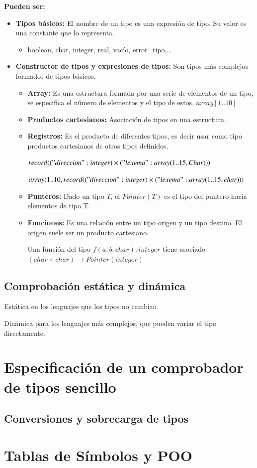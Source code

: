 \documentclass[12pt]{report} %
\begin{document}
\textbf{Pueden ser:}
\begin{itemize}
  \item \textbf{Tipos básicos:} El nombre de un tipo es una expresión de tipo. Su valor es una constante que lo representa.
  \begin{itemize}
    \item boolean, char, integer, real, vacío, error\_tipo,\dots
  \end{itemize}
  \item \textbf{Constructor de tipos y expresiones de tipos:} Son tipos más complejos formados de tipos básicos.
  \begin{itemize}
    \item \textbf{Array:} Es una estructura formada por una serie de elementos de un tipo, se especifica el número de elementos y el tipo de estos. $array[1\text{..}10]$
    \item \textbf{Productos cartesianos:} Asociación de tipos en una estructura.
    \item \textbf{Registros:} Es el producto de diferentes tipos, es decir usar como tipo productos cartesianos de otros tipos definidos.
    
    $record (("direccion" : integer) \times ("lexema" : array(1..15, Char)))$
    
    $array(1\text{..}10, record (("direccion" : integer) \times ("lexema" : array(1\text{..}15,char)))$

    \item \textbf{Punteros:} Dado un tipo $T$, el $Pointer(T)$ es el tipo del puntero hacia elementos de tipo T.
    \item \textbf{Funciones:} Es una relación entre un tipo origen y un tipo destino. El origen suele ser un producto cartesiano.
    
    Una función del tipo $f(a,b:char) : \hat{} integer$ tiene asociado $(char \times char) \rightarrow Pointer(integer)$
  \end{itemize}
\end{itemize}


\subsection{Comprobación estática y dinámica}
Estática en los lenguajes que los tipos no cambian.

Dinámica para los lenguajes más complejos, que pueden variar el tipo directamente.
\section{Especificación de un comprobador de tipos sencillo}
\subsection{Conversiones y sobrecarga de tipos}
\section{Tablas de Símbolos y POO}
\end{document}
